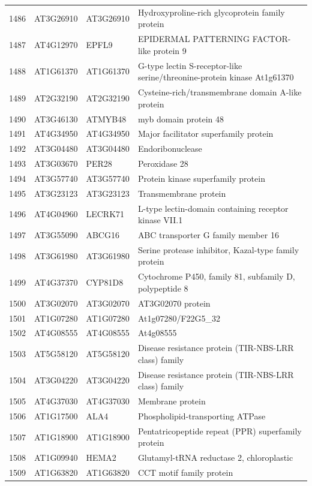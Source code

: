\documentclass[11pt]{article}
\begin{document}
\begin{center}
\begin{tabular}{rlll}
1486 & AT3G26910 & AT3G26910 & Hydroxyproline-rich glycoprotein family protein\\
1487 & AT4G12970 & EPFL9 & EPIDERMAL PATTERNING FACTOR-like protein 9\\
1488 & AT1G61370 & AT1G61370 & G-type lectin S-receptor-like serine/threonine-protein kinase At1g61370\\
1489 & AT2G32190 & AT2G32190 & Cysteine-rich/transmembrane domain A-like protein\\
1490 & AT3G46130 & ATMYB48 & myb domain protein 48\\
1491 & AT4G34950 & AT4G34950 & Major facilitator superfamily protein\\
1492 & AT3G04480 & AT3G04480 & Endoribonuclease\\
1493 & AT3G03670 & PER28 & Peroxidase 28\\
1494 & AT3G57740 & AT3G57740 & Protein kinase superfamily protein\\
1495 & AT3G23123 & AT3G23123 & Transmembrane protein\\
1496 & AT4G04960 & LECRK71 & L-type lectin-domain containing receptor kinase VII.1\\
1497 & AT3G55090 & ABCG16 & ABC transporter G family member 16\\
1498 & AT3G61980 & AT3G61980 & Serine protease inhibitor, Kazal-type family protein\\
1499 & AT4G37370 & CYP81D8 & Cytochrome P450, family 81, subfamily D, polypeptide 8\\
1500 & AT3G02070 & AT3G02070 & AT3G02070 protein\\
1501 & AT1G07280 & AT1G07280 & At1g07280/F22G5\_32\\
1502 & AT4G08555 & AT4G08555 & At4g08555\\
1503 & AT5G58120 & AT5G58120 & Disease resistance protein (TIR-NBS-LRR class) family\\
1504 & AT3G04220 & AT3G04220 & Disease resistance protein (TIR-NBS-LRR class) family\\
1505 & AT4G37030 & AT4G37030 & Membrane protein\\
1506 & AT1G17500 & ALA4 & Phospholipid-transporting ATPase\\
1507 & AT1G18900 & AT1G18900 & Pentatricopeptide repeat (PPR) superfamily protein\\
1508 & AT1G09940 & HEMA2 & Glutamyl-tRNA reductase 2, chloroplastic\\
1509 & AT1G63820 & AT1G63820 & CCT motif family protein\\

\end{tabular}
\end{center}
\end{document}
